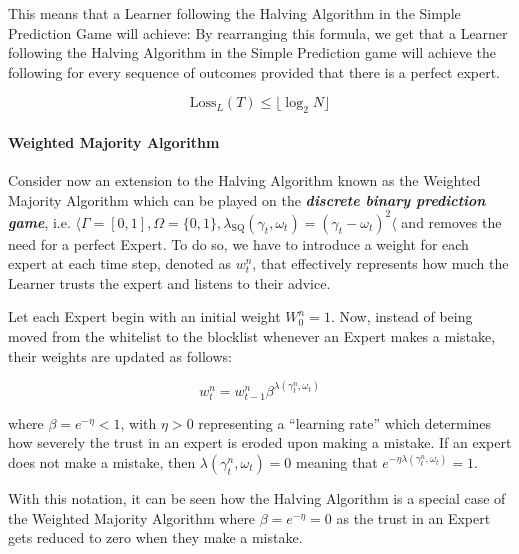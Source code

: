 This means that a Learner following the Halving Algorithm in the Simple Prediction Game will achieve:
By rearranging this formula, we get that a Learner following the Halving Algorithm in the Simple Prediction game will achieve the following for every sequence of outcomes provided that there is a perfect expert.

\begin{equation}
    \text{Loss}_L(T) \leq \lfloor \log_2 N \rfloor
\end{equation}

\paragraph{Weighted Majority Algorithm}\label{paragraph:weighted_majority_algorithm}
Consider now an extension to the Halving Algorithm known as the Weighted Majority Algorithm which can be played on the \textbf{\textit{discrete binary prediction game}}, i.e. $\langle \Gamma = [0, 1], \Omega = \{0, 1\}, \lambda_\text{SQ}(\gamma_t, \omega_t) = {(\gamma_t - \omega_t)}^2 \langle$ and removes the need for a perfect Expert. To do so, we have to introduce a weight for each expert at each time step, denoted as $w^n_t$, that effectively represents how much the Learner trusts the expert and listens to their advice.

Let each Expert begin with an initial weight $W^n_0 = 1$. Now, instead of being moved from the whitelist to the blocklist whenever an Expert makes a mistake, their weights are updated as follows:

\begin{equation}
    w^n_t = w^n_{t-1} \beta^{\lambda(\gamma^n_t, \omega_t)}
\end{equation}

where $\beta = e^{-\eta} < 1$, with $\eta > 0$ representing a ``learning rate'' which determines how severely the trust in an expert is eroded upon making a mistake. If an expert does not make a mistake, then $\lambda(\gamma^n_t, \omega_t) = 0$ meaning that $e^{-\eta \lambda(\gamma^n_t, \omega_t)} = 1$.

With this notation, it can be seen how the Halving Algorithm is a special case of the Weighted Majority Algorithm where $\beta = e^{-\eta} = 0$ as the trust in an Expert gets reduced to zero when they make a mistake.

